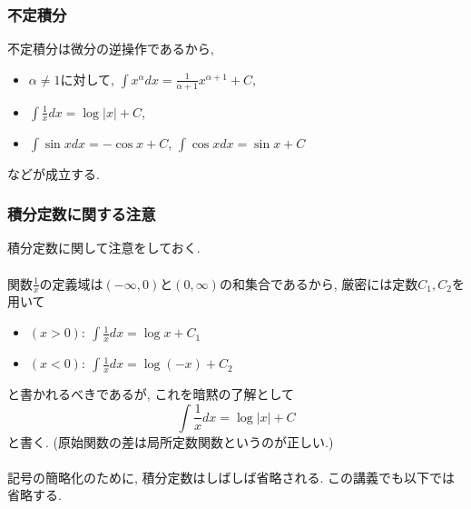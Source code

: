 \documentclass[dvipdfmx,cjk,10.2pt]{beamer}
\theoremstyle{definition}
\begin{document}



\begin{frame}
\frametitle{不定積分}

不定積分は微分の逆操作であるから, 
\begin{itemize}
\item $\alpha \ne 1$に対して, $\displaystyle \int x^\alpha dx = \frac{1}{\alpha+1}x^{\alpha+1}+C$,
\item $\displaystyle \int \frac{1}{x}dx = \log |x|+C$,
\item $\displaystyle \int \sin x dx = -\cos x+C$, $\displaystyle \int \cos x dx = \sin x+C$
\end{itemize}
などが成立する. 

\end{frame}







\begin{frame}
\frametitle{積分定数に関する注意}

積分定数に関して注意をしておく. \\
\ \\

関数$\frac{1}{x}$の定義域は$(-\infty,0)$と$(0,\infty)$の和集合であるから, 厳密には定数$C_1,C_2$を用いて
\begin{itemize}
\item $(x>0): \ \int \frac{1}{x}dx = \log x + C_1$
\item $(x<0): \ \int \frac{1}{x}dx = \log (-x) + C_2$
\end{itemize}
と書かれるべきであるが, これを暗黙の了解として
$$
 \int \frac{1}{x}dx = \log |x| +C
$$
と書く. (原始関数の差は局所定数関数というのが正しい.)\\
\ \\

記号の簡略化のために, 積分定数はしばしば省略される. この講義でも以下では省略する.  

\end{frame}


\end{document}
